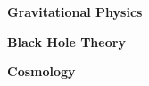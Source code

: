 
\begin{cventries}
  \vspace{-0.5cm}
  \cventry
    {} %
    {} %
    {} %
    {} %
    {
      \begin{cvitems} %
         \item{\textbf{Gravitational Physics}}
         \item{\textbf{Black Hole Theory}}
         \item{\textbf{Cosmology}}
      \end{cvitems}
    }
  \vspace{-0.4cm}
\end{cventries}
